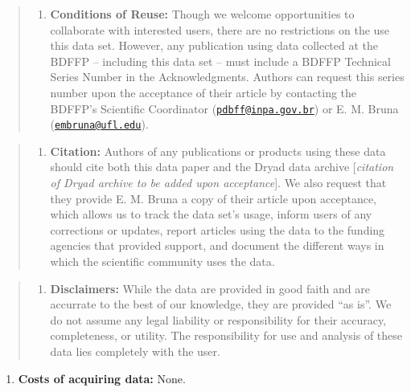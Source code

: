 \documentclass[
  12pt,
  man, donotrepeattitle,floatsintext]{apa6}
\providecommand{\tightlist}{%
  \setlength{\itemsep}{0pt}\setlength{\parskip}{0pt}}
\begin{document}
\begin{quote}
\begin{enumerate}
\def\labelenumi{\alph{enumi}.}
\tightlist
\item
  \textbf{Conditions of Reuse:} Though we welcome opportunities to collaborate with interested users, there are no restrictions on the use this data set. However, any publication using data collected at the BDFFP -- including this data set -- must include a BDFFP Technical Series Number in the Acknowledgments. Authors can request this series number upon the acceptance of their article by contacting the BDFFP's Scientific Coordinator (\href{mailto:pdbff@inpa.gov.br}{\nolinkurl{pdbff@inpa.gov.br}}) or E. M. Bruna (\href{mailto:embruna@ufl.edu}{\nolinkurl{embruna@ufl.edu}}).
\end{enumerate}
\end{quote}

\begin{quote}
\begin{enumerate}
\def\labelenumi{\alph{enumi}.}
\setcounter{enumi}{1}
\tightlist
\item
  \textbf{Citation:} Authors of any publications or products using these data should cite both this data paper and the Dryad data archive {[}\emph{citation of Dryad archive to be added upon acceptance}{]}. We also request that they provide E. M. Bruna a copy of their article upon acceptance, which allows us to track the data set's usage, inform users of any corrections or updates, report articles using the data to the funding agencies that provided support, and document the different ways in which the scientific community uses the data.
\end{enumerate}
\end{quote}

\begin{quote}
\begin{enumerate}
\def\labelenumi{\alph{enumi}.}
\setcounter{enumi}{2}
\tightlist
\item
  \textbf{Disclaimers:} While the data are provided in good faith and are accurrate to the best of our knowledge, they are provided ``as is''. We do not assume any legal liability or responsibility for their accuracy, completeness, or utility. The responsibility for use and analysis of these data lies completely with the user.
\end{enumerate}
\end{quote}

\begin{enumerate}
\def\labelenumi{\arabic{enumi}.}
\setcounter{enumi}{4}
\tightlist
\item
  \textbf{Costs of acquiring data:} None.
\end{enumerate}
\end{document}
